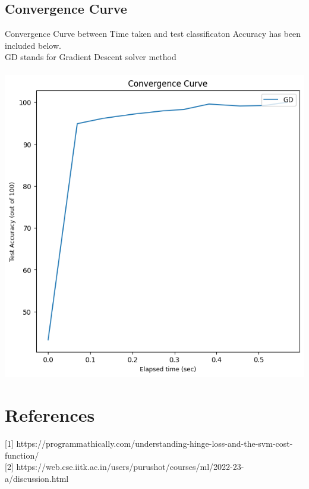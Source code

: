 \documentclass{article}
\begin{document}
\subsection{Convergence Curve}
Convergence Curve between Time taken and test classificaton Accuracy has been included below.\\
GD stands for Gradient Descent solver method\\
\\
\includegraphics[scale=1]{images/convergence.png}



\section{References}

\medskip

{
\small
[1] https://programmathically.com/understanding-hinge-loss-and-the-svm-cost-function/\\

[2] https://web.cse.iitk.ac.in/users/purushot/courses/ml/2022-23-a/discussion.html
}
\end{document}
